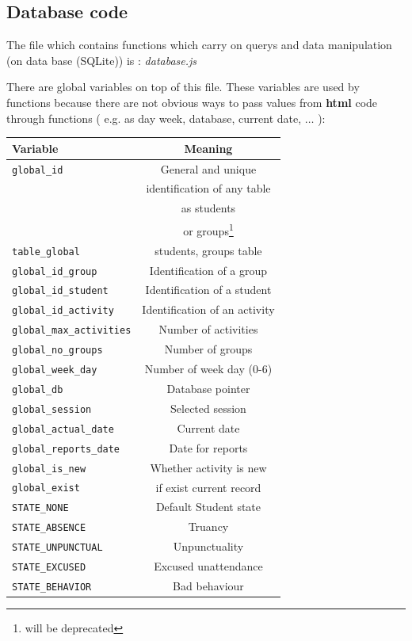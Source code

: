 	
	\subsection{Database code}
  The file which contains functions which carry on querys and data manipulation (on data base (SQLite)) is : \emph{ database.js}

There are  global variables on top of this file. These variables are used by functions because there are not obvious
ways to pass values from {\bf html } code  through functions ( e.g. as day week, database, current date, $\dots$ ):

  
\begin{shadowblock}{13cm}
\begin{tabular}{lc}
{\bf Variable}  & {\bf Meaning } \\
  \hline
  \texttt{global\_id}  & General and unique \\
                       & identification of any table   \\
                       & as students  \\                       
                       & or groups\footnote{will be deprecated} \\
\texttt{table\_global} & students, groups table\\

\texttt{global\_id\_group} &  Identification of a group \\
\texttt{global\_id\_student } &  Identification of a student \\
\texttt{global\_id\_activity} &  Identification of an activity  \\
\texttt{global\_max\_activities}& Number of activities \\
\texttt{global\_no\_groups} & Number of groups\\
\texttt{global\_week\_day} & Number of week day (0-6) \\
\texttt{global\_db }& Database pointer \\
\texttt{global\_session} &  Selected session \\
\texttt{global\_actual\_date} & Current date \\
\texttt{global\_reports\_date} & Date for reports\\

\texttt{global\_is\_new} & Whether activity is new \\

\texttt{global\_exist } & if exist current record\\

\texttt{STATE\_NONE  }& Default Student state\\
\texttt{STATE\_ABSENCE} & Truancy \\
\texttt{STATE\_UNPUNCTUAL}  & Unpunctuality \\
\texttt{STATE\_EXCUSED} & Excused unattendance  \\
\texttt{STATE\_BEHAVIOR } &  Bad behaviour \\

\end{tabular}
\end{shadowblock}

